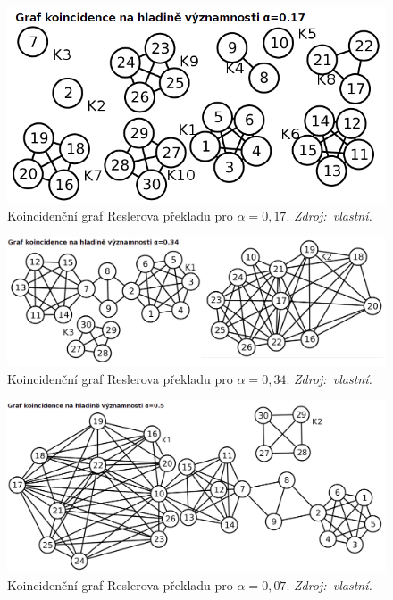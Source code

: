 \documentclass[dp.tex]{subfiles}
\begin{document}
\begin{figure}[H]
	\centering
	\includegraphics[max width=\textwidth,keepaspectratio=true]{imgs-70-prakticka/denotation-resler-017}
	\caption[Koincidenční graf Reslerova překladu pro $\alpha = 0{,}17$.]{Koincidenční graf Reslerova překladu pro $\alpha = 0{,}17$. \textit{Zdroj:~vlastní.}}
	\label{fig:denotation-resler-005}
\end{figure}

\begin{figure}[H]
	\centering
	\includegraphics[max width=\textwidth,keepaspectratio=true]{imgs-70-prakticka/denotation-resler-034}
	\caption[Koincidenční graf Reslerova překladu pro $\alpha = 0{,}34$.]{Koincidenční graf Reslerova překladu pro $\alpha = 0{,}34$. \textit{Zdroj:~vlastní.}}
	\label{fig:denotation-resler-034}
\end{figure}

\begin{figure}[H]
	\centering
	\includegraphics[max width=\textwidth,keepaspectratio=true]{imgs-70-prakticka/denotation-resler-05}
	\caption[Koincidenční graf Reslerova překladu pro $\alpha = 0{,}07$.]{Koincidenční graf Reslerova překladu pro $\alpha = 0{,}07$. \textit{Zdroj:~vlastní.}}
	\label{fig:denotation-resler-007}
\end{figure}
\end{document}
